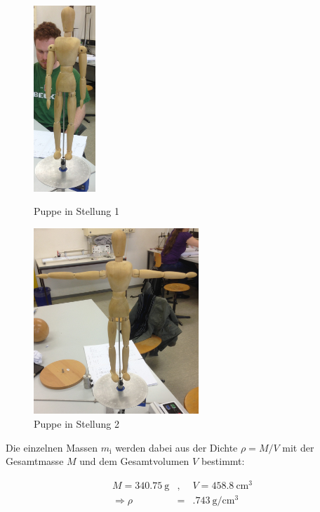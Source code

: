 				\begin{figure}[h]
					\begin{minipage}[t]{7cm}
						\vspace{0pt}
						\centering
						\includegraphics[height = 7cm]{img/pupp1.jpg}
						\caption{Puppe in Stellung 1}
						\label{fig:puppe1}
					\end{minipage}
					\hfill
					\begin{minipage}[t]{7cm}
						\vspace{0pt}
						\centering
						\includegraphics[height = 7cm]{img/pupp2.jpg}
						\caption{Puppe in Stellung 2}
						\label{fig:puppe2}
					\end{minipage}
				\end{figure}

				Die einzelnen Massen $m_\mathrm{i}$ werden dabei aus der Dichte $\rho = M / V$ mit der Gesamtmasse $M$ und dem Gesamtvolumen $V$ bestimmt:

				\begin{eqnarray*}
					M = \SI{340.75}{\gram} & , & V = \SI{458.8}{\centi \meter \cubed} \\
					\Rightarrow \rho & = & \SI{.743}{\gram \per \centi \meter \cubed}
				\end{eqnarray*}

